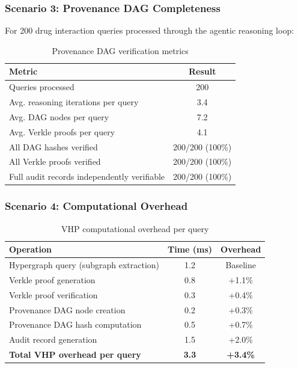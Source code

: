 \documentclass[11pt,a4paper]{article}
\begin{document}
\subsubsection{Scenario 3: Provenance DAG Completeness}

For 200 drug interaction queries processed through the agentic reasoning loop:

\begin{table}[H]
\centering
\caption{Provenance DAG verification metrics}
\label{tab:provenance_eval}
\begin{tabular}{@{}lc@{}}
\toprule
\textbf{Metric} & \textbf{Result} \\ \midrule
Queries processed & 200 \\
Avg. reasoning iterations per query & 3.4 \\
Avg. DAG nodes per query & 7.2 \\
Avg. Verkle proofs per query & 4.1 \\
All DAG hashes verified & 200/200 (100\%) \\
All Verkle proofs verified & 200/200 (100\%) \\
Full audit records independently verifiable & 200/200 (100\%) \\ \bottomrule
\end{tabular}
\end{table}

\subsubsection{Scenario 4: Computational Overhead}

\begin{table}[H]
\centering
\caption{VHP computational overhead per query}
\label{tab:overhead}
\begin{tabular}{@{}lcc@{}}
\toprule
\textbf{Operation} & \textbf{Time (ms)} & \textbf{Overhead} \\ \midrule
Hypergraph query (subgraph extraction) & 1.2 & Baseline \\
Verkle proof generation & 0.8 & +1.1\% \\
Verkle proof verification & 0.3 & +0.4\% \\
Provenance DAG node creation & 0.2 & +0.3\% \\
Provenance DAG hash computation & 0.5 & +0.7\% \\
Audit record generation & 1.5 & +2.0\% \\
\textbf{Total VHP overhead per query} & \textbf{3.3} & \textbf{+3.4\%} \\ \bottomrule
\end{tabular}
\end{table}
\end{document}
